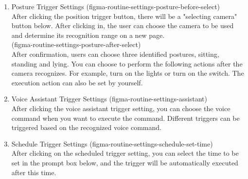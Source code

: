 \begin{enumerate}[label=\arabic*.]
\begin{enumerate}[label=\alph*]
\begin{enumerate}
                        \item  Posture Trigger Settings
                            (figma-routine-settings-posture-before-select)\\
                              After clicking the position trigger button, there will be a "selecting camera" button below. After clicking in, the user can choose the camera to be used and determine its recognition range on a new page. \\
                              (figma-routine-settings-posture-after-select)\\

                            After confirmation, users can choose three identified postures, sitting, standing and lying. 
                            You can choose to perform the following actions after the camera recognizes. For example, turn on the lights or turn on the switch. The execution action can also be set by yourself.\\

                        \item  Voice Assistant Trigger Settings
                        (figma-routine-settings-assistant)\\
                              After clicking the voice assistant trigger setting, you can choose the voice command when you want to execute the command. Different triggers can be triggered based on the recognized voice command.\\
                        \item  Schedule Trigger Settings
                    (figma-routine-settings-schedule-set-time)\\
                              After clicking on the scheduled trigger setting, you can select the time to be set in the prompt box below, and the trigger will be automatically executed after this time.\\
                    \end{enumerate}
          \end{enumerate}


\end{enumerate}

